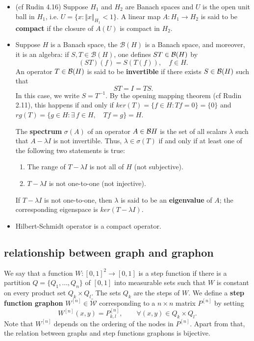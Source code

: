 \begin{remark}
\begin{itemize}
		
		\item (cf Rudin 4.16) Suppose $H_1$ and $H_2$ are Banach spaces and $U$ is the open unit ball in $H_1$, i.e. $U= \{x: \Vert x \Vert_{H_1} < 1 \}$. A linear map $A: H_1 \to H_2$ is said to be \textbf{compact} if the closure of $A(U)$ is compact in $H_2$. 
		
		\item Suppose $H$ is a Banach space, the $\mathcal{B}(H)$ is a Banach space, and moreover, it is an algebra: if $S, T \in \mathcal{B}(H)$, one defines $ST \in {\cal B}(H)$ by 
		$$
			(ST)(f) = S(T(f)), \quad f \in H.
		$$
		An operator $ T \in {\cal B}(H)$ is said to be \textbf{invertible} if there exists $S \in {\cal B}(H)$ such that
		$$
			ST = I = TS.
		$$	
		In this case, we write $S = T^{-1}$. By the opening mapping theorem (cf Rudin 2.11), this happens if and only if $ker(T) = \{f \in H: Tf = 0\} = \{0\}$ and $rg(T) = \{g\in H : \exists \, f \in H, \quad Tf = g\} = H$. 
		
		The \textbf{spectrum} $\sigma(A)$ of an operator $A \in {\cal B}{H}$ is the set of all scalars $\lambda$ such that $A-\lambda I$ is not invertible. Thus, $\lambda \in \sigma(T)$ if and only if at least one of the following two statements is true:
		\begin{enumerate}
			\item The range of $T-\lambda I$ is not all of $H$ (not subjective).
			\item $T-\lambda I$ is not one-to-one (not injective).
		\end{enumerate}		
		
		If $T-\lambda I$ is not one-to-one, then $\lambda$ is said to be an \textbf{eigenvalue} of $A$; the corresponding eigenspace is $ker(T-\lambda I)$.
		
		
		
		
		\item Hilbert-Schmidt operator is a compact operator.
	
	\end{itemize}
\end{remark}


\subsection{relationship between graph and graphon}

\begin{definition}
	We say that a function $W: [0,1]^2 \to [0,1]$ is a step function if there is a partition $Q = \{Q_1, \ldots, Q_n \}$ of $[0,1]$ into measurable sets such that $W$ is constant on every product set $Q_k \times Q_l$. The sets $Q_k$ are the steps of $W$. We define a \textbf{step function graphon} $W^[n] \in \tilde{\mathcal{W}}$ corresponding to a $n\times n$ matrix $P^{[n]}$ by setting
	\begin{equation}
	W^{[n]}(x,y) = P_{k,l}^{[n]}, \qquad \forall (x,y) \in Q_k \times Q_l.
	\end{equation}
	Note that $W^{[n]}$ depends on the ordering of the nodes in $P^{[n]}$. Apart from that, the relation between graphs and step functions graphons is bijective.
\end{definition}

